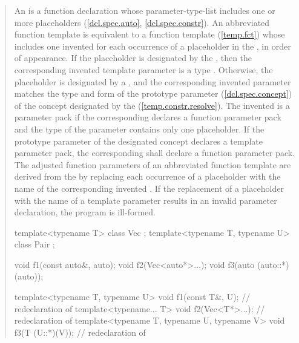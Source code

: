 \begin{quote}
\pnum
An  is a function declaration whose
parameter-type-list includes one or more placeholders (\ref{dcl.spec.auto},
\ref{dcl.spec.constr}).
% 
An abbreviated function template is equivalent to a function template
(\ref{temp.fct}) whose 
includes one invented  for each occurrence 
of a placeholder in the ,
in order of appearance. 
% 
If the placeholder is designated by the 
, then the corresponding invented template 
parameter is a type .
% 
Otherwise, the placeholder is designated by a 
, and the corresponding invented 
parameter matches the type and form of the prototype parameter 
(\ref{dcl.spec.concept}) of the concept designated by the 
 (\ref{temp.constr.resolve}).
% 
The invented  is a parameter pack if 
the corresponding  declares a function 
parameter pack and the type of the parameter contains only one placeholder.
% 
If the prototype parameter of the designated concept declares a template 
parameter pack, the corresponding  shall
declare a function parameter pack.
% 
The adjusted function parameters of an abbreviated function template are derived
from the  by replacing each 
occurrence of a placeholder with the name of the corresponding invented 
.
% 
If the replacement of a placeholder with the name of a template parameter
results in an invalid parameter declaration, the program is ill-formed.

\enterexample
\begin{codeblock}
template<typename T> class Vec { };
template<typename T, typename U> class Pair { };

void f1(const auto&, auto);
void f2(Vec<auto*>...);
void f3(auto (auto::*)(auto));

template<typename T, typename U> 
  void f1(const T&, U);        // redeclaration of 
template<typename... T> 
  void f2(Vec<T*>...);         // redeclaration of 
template<typename T, typename U, typename V>
  void f3(T (U::*)(V));        // redeclaration of 


\end{codeblock}
\end{quote}
